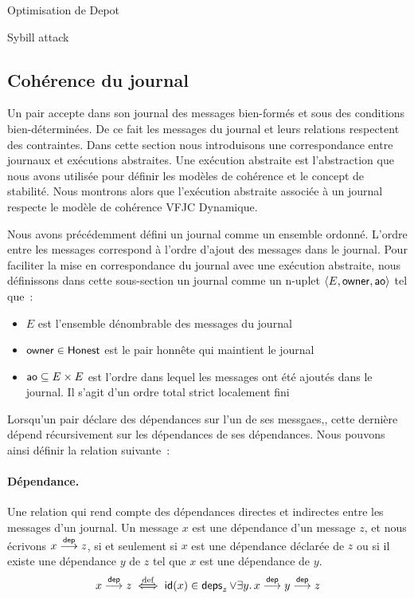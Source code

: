 Optimisation de Depot

Sybill attack


\subsection{Cohérence du journal}

Un pair accepte dans son journal des messages bien-formés et sous des conditions bien-déterminées.
De ce fait les messages du journal et leurs relations respectent des contraintes.
Dans cette section nous introduisons une correspondance entre journaux et exécutions abstraites.
Une exécution abstraite est l'abstraction que nous avons utilisée pour définir les modèles de cohérence et le concept de stabilité.
Nous montrons alors que l'exécution abstraite associée à un journal respecte le modèle de cohérence \acl{VFJC} Dynamique.

Nous avons précédemment défini un journal comme un ensemble ordonné.
L'ordre entre les messages correspond à l'ordre d'ajout des messages dans le journal.
Pour faciliter la mise en correspondance du journal avec une exécution abstraite, nous définissons dans cette sous-section un journal comme un n-uplet $\tuple*{E, \trm{owner}, \trm{ao}}$ tel que~:
\begin{itemize}
    \item $E$ est l'ensemble dénombrable des messages du journal
    \item $\trm{owner} \in \trm{Honest}$ est le pair honnête qui maintient le journal
    \item $\trm{ao} \subseteq E \times E$ est l'ordre dans lequel les messages ont été ajoutés dans le journal.
    Il s'agit d'un ordre total strict localement fini
\end{itemize}

Lorsqu'un pair déclare des dépendances sur l'un de ses messgaes,, cette dernière dépend récursivement sur les dépendances de ses dépendances.
Nous pouvons ainsi définir la relation suivante~:

\paragraph{Dépendance.} Une relation qui rend compte des dépendances directes et indirectes entre les messages d'un journal.
Un message $x$ est une dépendance d'un message $z$, et nous écrivons $x \dep z$, si et seulement si $x$ est une dépendance déclarée de $z$ ou si il existe une dépendance $y$ de $z$ tel que $x$ est une dépendance de $y$.
\begin{equation*}
    x \dep z \defiff \trm{id}(x) \in \trm{deps}_z \lor \exists y \qsep x \dep y \dep z
\end{equation*}

